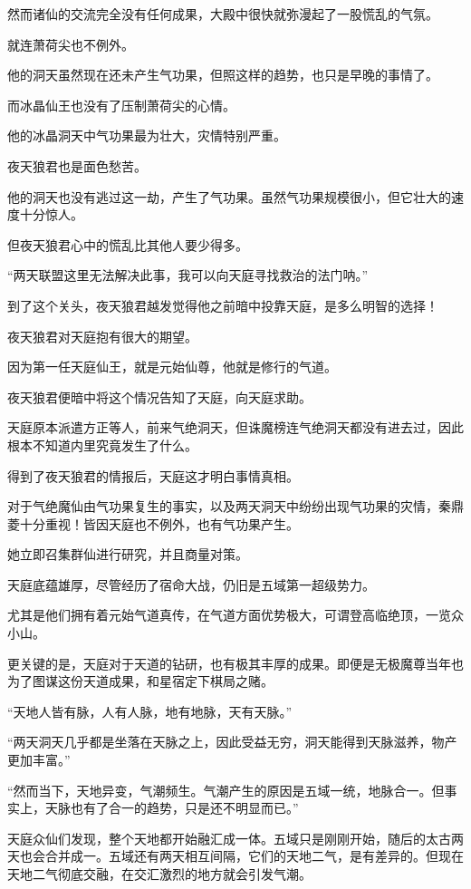 \begin{this_body}
然而诸仙的交流完全没有任何成果，大殿中很快就弥漫起了一股慌乱的气氛。

就连萧荷尖也不例外。

他的洞天虽然现在还未产生气功果，但照这样的趋势，也只是早晚的事情了。

而冰晶仙王也没有了压制萧荷尖的心情。

他的冰晶洞天中气功果最为壮大，灾情特别严重。

夜天狼君也是面色愁苦。

他的洞天也没有逃过这一劫，产生了气功果。虽然气功果规模很小，但它壮大的速度十分惊人。

但夜天狼君心中的慌乱比其他人要少得多。

“两天联盟这里无法解决此事，我可以向天庭寻找救治的法门呐。”

到了这个关头，夜天狼君越发觉得他之前暗中投靠天庭，是多么明智的选择！

夜天狼君对天庭抱有很大的期望。

因为第一任天庭仙王，就是元始仙尊，他就是修行的气道。

夜天狼君便暗中将这个情况告知了天庭，向天庭求助。

天庭原本派遣方正等人，前来气绝洞天，但诛魔榜连气绝洞天都没有进去过，因此根本不知道内里究竟发生了什么。

得到了夜天狼君的情报后，天庭这才明白事情真相。

对于气绝魔仙由气功果复生的事实，以及两天洞天中纷纷出现气功果的灾情，秦鼎菱十分重视！皆因天庭也不例外，也有气功果产生。

她立即召集群仙进行研究，并且商量对策。

天庭底蕴雄厚，尽管经历了宿命大战，仍旧是五域第一超级势力。

尤其是他们拥有着元始气道真传，在气道方面优势极大，可谓登高临绝顶，一览众小山。

更关键的是，天庭对于天道的钻研，也有极其丰厚的成果。即便是无极魔尊当年也为了图谋这份天道成果，和星宿定下棋局之赌。

“天地人皆有脉，人有人脉，地有地脉，天有天脉。”

“两天洞天几乎都是坐落在天脉之上，因此受益无穷，洞天能得到天脉滋养，物产更加丰富。”

“然而当下，天地异变，气潮频生。气潮产生的原因是五域一统，地脉合一。但事实上，天脉也有了合一的趋势，只是还不明显而已。”

天庭众仙们发现，整个天地都开始融汇成一体。五域只是刚刚开始，随后的太古两天也会合并成一。五域还有两天相互间隔，它们的天地二气，是有差异的。但现在天地二气彻底交融，在交汇激烈的地方就会引发气潮。


\end{this_body}
